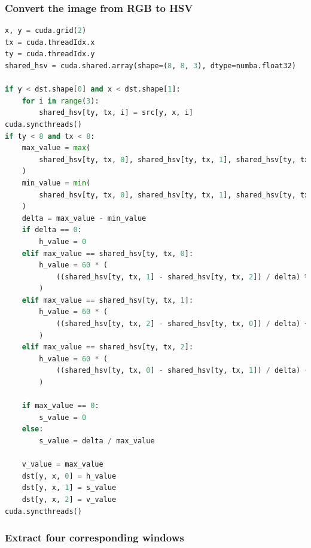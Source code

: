 \documentclass[12pt]{article}
\begin{document}
\subsubsection{Convert the image from RGB to HSV}
\begin{lstlisting}[language=Python]
x, y = cuda.grid(2)
tx = cuda.threadIdx.x
ty = cuda.threadIdx.y
shared_hsv = cuda.shared.array(shape=(8, 8, 3), dtype=numba.float32)

if y < dst.shape[0] and x < dst.shape[1]:
    for i in range(3):
        shared_hsv[ty, tx, i] = src[y, x, i]
cuda.syncthreads()
if ty < 8 and tx < 8:
    max_value = max(
        shared_hsv[ty, tx, 0], shared_hsv[ty, tx, 1], shared_hsv[ty, tx, 2]
    )
    min_value = min(
        shared_hsv[ty, tx, 0], shared_hsv[ty, tx, 1], shared_hsv[ty, tx, 2]
    )
    delta = max_value - min_value
    if delta == 0:
        h_value = 0
    elif max_value == shared_hsv[ty, tx, 0]:
        h_value = 60 * (
            ((shared_hsv[ty, tx, 1] - shared_hsv[ty, tx, 2]) / delta) % 6
        )
    elif max_value == shared_hsv[ty, tx, 1]:
        h_value = 60 * (
            ((shared_hsv[ty, tx, 2] - shared_hsv[ty, tx, 0]) / delta) + 2
        )
    elif max_value == shared_hsv[ty, tx, 2]:
        h_value = 60 * (
            ((shared_hsv[ty, tx, 0] - shared_hsv[ty, tx, 1]) / delta) + 4
        )

    if max_value == 0:
        s_value = 0
    else:
        s_value = delta / max_value

    v_value = max_value
    dst[y, x, 0] = h_value
    dst[y, x, 1] = s_value
    dst[y, x, 2] = v_value
cuda.syncthreads()

\end{lstlisting}


\subsubsection{Extract four corresponding windows}
\end{document}
